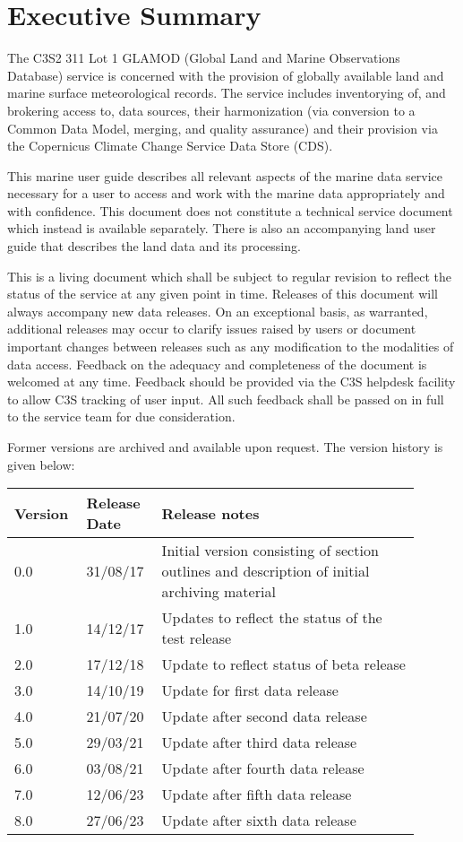 \section*{Executive Summary}

The C3S2 311 Lot 1 GLAMOD (Global Land and Marine Observations Database) service is concerned with the provision of globally available land and marine surface meteorological records. 
The service includes inventorying of, and brokering access to, data sources, their harmonization (via conversion to a Common Data Model, merging, and quality assurance) and their provision via the Copernicus Climate Change Service Data Store (CDS).

This marine user guide describes all relevant aspects of the marine data service necessary for a user to access and work with the marine data appropriately and with confidence. 
This document does not constitute a technical service document which instead is available separately. 
There is also an accompanying land user guide that describes the land data and its processing.

This is a living document which shall be subject to regular revision to reflect the status of the service at any given point in time. Releases of this document will always accompany new data releases. On an exceptional basis, as warranted, additional releases may occur to clarify issues raised by users or document important changes between releases such as any modification to the modalities of data access. Feedback on the adequacy and completeness of the document is welcomed at any time. Feedback should be provided via the C3S helpdesk facility to allow C3S tracking of user input. All such feedback shall be passed on in full to the service team for due consideration.

Former versions are archived and available upon request. The version history is given below:

\begin{table}[h]
\begin{tabular}{|p{0.15\linewidth}|p{0.15\linewidth}|p{0.60\linewidth}|}
\hline
\bfseries Version & \bfseries Release Date & \bfseries Release notes \\\hline
0.0	& 31/08/17	& Initial version consisting of section outlines and description of initial archiving material \\\hline
1.0	& 14/12/17	& Updates to reflect the status of the test release \\\hline
2.0	& 17/12/18	& Update to reflect status of beta release \\\hline
3.0	& 14/10/19	& Update for first data release \\\hline
4.0	& 21/07/20	& Update after second data release \\\hline
5.0 & 29/03/21  & Update after third data release \\\hline
6.0 & 03/08/21  & Update after fourth data release \\\hline
7.0 & 12/06/23    & Update after fifth data release \\\hline
8.0 & 27/06/23   & Update after sixth data release \\\hline
\end{tabular}
\end{table}
\FloatBarrier
